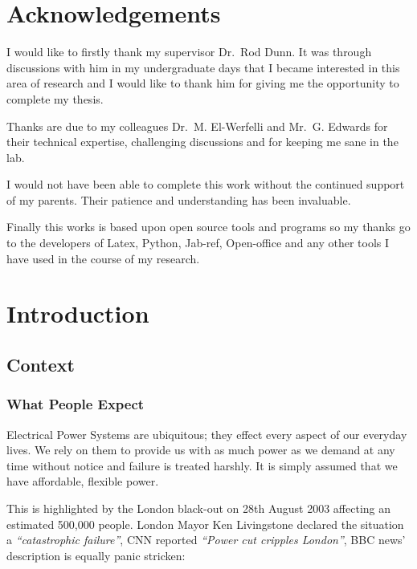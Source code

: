 \documentclass[a4paper,oneside,12pt]{report}
\newcommand{\inlinequote}[1]{\emph{``#1''}}
\newcommand{\mainmatter}{\cleardoublepage\pagenumbering{arabic}}
\begin{document}
\chapter*{Acknowledgements}

I would like to firstly thank my supervisor Dr.~Rod Dunn. It was through discussions with him in my undergraduate days that I became interested in this area of research and I would like to thank him for giving me the opportunity to complete my thesis.

Thanks are due to my colleagues Dr.~M. El-Werfelli and Mr.~G. Edwards for their technical expertise, challenging discussions and for keeping me sane in the lab.

I would not have been able to complete this work without the continued support of my parents. Their patience and understanding has been invaluable.

Finally this works is based upon open source tools and programs so my thanks go to the developers of Latex, Python, Jab-ref, Open-office and any other tools I have used in the course of my research.



\mainmatter



\chapter{Introduction}

\section{Context}
\subsection{What People Expect}

Electrical Power Systems are ubiquitous; they effect every aspect of our everyday lives. We rely on them to provide us with as much power as we demand at any time without notice and failure is treated harshly. It is simply assumed that we have affordable, flexible power.

This is highlighted by the London black-out on 28th August 2003 affecting an estimated 500,000 people. London Mayor Ken Livingstone declared the situation a \inlinequote{catastrophic failure}, CNN reported \inlinequote{Power cut cripples London}, BBC news' description is equally panic stricken:
\end{document}
